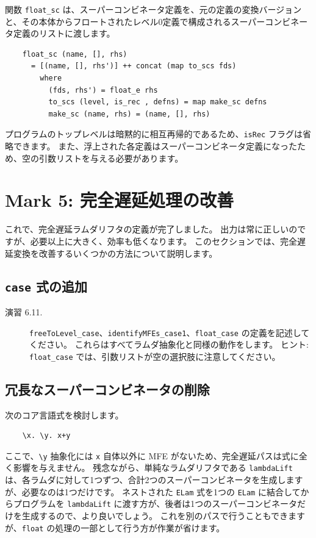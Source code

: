 \documentclass{jbook}
\begin{document}
関数 \texttt{float\_sc} は、スーパーコンビネータ定義を、元の定義の変換バージョンと、その本体からフロートされたレベル0定義で構成されるスーパーコンビネータ定義のリストに渡します。

\begin{verbatim}
	float_sc (name, [], rhs)
	  = [(name, [], rhs')] ++ concat (map to_scs fds)
	    where
	      (fds, rhs') = float_e rhs
	      to_scs (level, is_rec , defns) = map make_sc defns
	      make_sc (name, rhs) = (name, [], rhs)
\end{verbatim}

プログラムのトップレベルは暗黙的に相互再帰的であるため、\texttt{isRec} フラグは省略できます。
また、浮上された各定義はスーパーコンビネータ定義になったため、空の引数リストを与える必要があります。

\newpage

\section{Mark 5: 完全遅延処理の改善}

これで、完全遅延ラムダリフタの定義が完了しました。
出力は常に正しいのですが、必要以上に大きく、効率も低くなります。
このセクションでは、完全遅延変換を改善するいくつかの方法について説明します。

\subsection{\texttt{case} 式の追加}

\begin{description}
	\item[演習 6.11.] \texttt{freeToLevel\_case}、\texttt{identifyMFEs\_case1}、\texttt{float\_case} の定義を記述してください。
		これらはすべてラムダ抽象化と同様の動作をします。
		ヒント: \texttt{float\_case} では、引数リストが空の選択肢に注意してください。
\end{description}

\subsection{冗長なスーパーコンビネータの削除}

次のコア言語式を検討します。

\begin{verbatim}
	\x. \y. x+y
\end{verbatim}

ここで、\texttt{\textbackslash y} 抽象化には \texttt{x} 自体以外に MFE がないため、完全遅延パスは式に全く影響を与えません。
残念ながら、単純なラムダリフタである \texttt{lambdaLift} は、各ラムダに対して1つずつ、合計2つのスーパーコンビネータを生成しますが、必要なのは1つだけです。
ネストされた \texttt{ELam} 式を1つの \texttt{ELam} に結合してからプログラムを \texttt{lambdaLift} に渡す方が、後者は1つのスーパーコンビネータだけを生成するので、より良いでしょう。
これを別のパスで行うこともできますが、\texttt{float} の処理の一部として行う方が作業が省けます。
\end{document}
